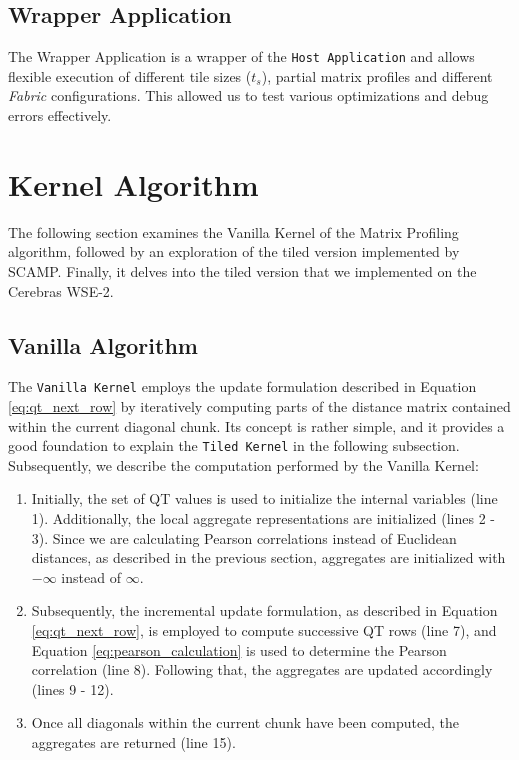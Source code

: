 \subsection{Wrapper Application} \label{subsection:wrapper}

The Wrapper Application is a wrapper of the \texttt{Host Application} and allows flexible execution of different tile sizes ($t_s$), partial matrix profiles and different \textit{Fabric} configurations. This allowed us to test various optimizations and debug errors effectively.

\section{Kernel Algorithm} \label{section:kernel}

The following section examines the Vanilla Kernel of the Matrix Profiling algorithm, followed by an exploration of the tiled version implemented by SCAMP. Finally, it delves into the tiled version that we implemented on the Cerebras WSE-2.

\subsection{Vanilla Algorithm} \label{subsection:vanilla_kernel}

The \texttt{Vanilla Kernel} employs the update formulation described in Equation \ref{eq:qt_next_row} by iteratively computing parts of the distance matrix contained within the current diagonal chunk. Its concept is rather simple, and it provides a good foundation to explain the \texttt{Tiled Kernel} in the following subsection. Subsequently, we describe the computation performed by the Vanilla Kernel:

\begin{enumerate}
    \item Initially, the set of QT values is used to initialize the internal variables (line 1). Additionally, the local aggregate representations are initialized (lines 2 - 3). Since we are calculating Pearson correlations instead of Euclidean distances, as described in the previous section, aggregates are initialized with $-\infty$ instead of $\infty$.
    \item Subsequently, the incremental update formulation, as described in Equation \ref{eq:qt_next_row}, is employed to compute successive QT rows (line 7), and Equation \ref{eq:pearson_calculation} is used to determine the Pearson correlation (line 8). Following that, the aggregates are updated accordingly (lines 9 - 12).
    \item Once all diagonals within the current chunk have been computed, the aggregates are returned (line 15).
\end{enumerate}
    
